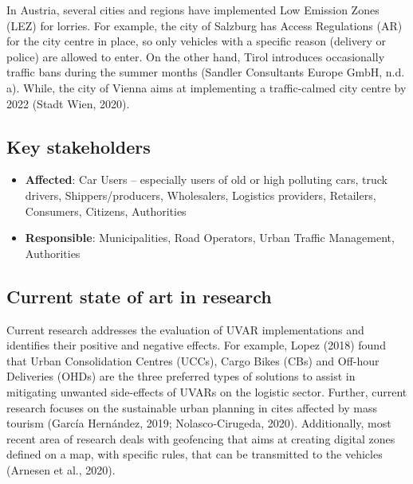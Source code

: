 \documentclass[
]{book}
\providecommand{\tightlist}{%
  \setlength{\itemsep}{0pt}\setlength{\parskip}{0pt}}
\begin{document}
In Austria, several cities and regions have implemented Low Emission Zones (LEZ) for lorries. For example, the city of Salzburg has Access Regulations (AR) for the city centre in place, so only vehicles with a specific reason (delivery or police) are allowed to enter. On the other hand, Tirol introduces occasionally traffic bans during the summer months (Sandler Consultants Europe GmbH, n.d. a). While, the city of Vienna aims at implementing a traffic-calmed city centre by 2022 (Stadt Wien, 2020).

\hypertarget{key-stakeholders-7}{%
\subsection*{Key stakeholders}\label{key-stakeholders-7}}

\begin{itemize}
\tightlist
\item
  \textbf{Affected}: Car Users -- especially users of old or high polluting cars, truck drivers, Shippers/producers, Wholesalers, Logistics providers, Retailers, Consumers, Citizens, Authorities
\item
  \textbf{Responsible}: Municipalities, Road Operators, Urban Traffic Management, Authorities
\end{itemize}

\hypertarget{current-state-of-art-in-research-7}{%
\subsection*{Current state of art in research}\label{current-state-of-art-in-research-7}}

Current research addresses the evaluation of UVAR implementations and identifies their positive and negative effects. For example, Lopez (2018) found that Urban Consolidation Centres (UCCs), Cargo Bikes (CBs) and Off-hour Deliveries (OHDs) are the three preferred types of solutions to assist in mitigating unwanted side-effects of UVARs on the logistic sector. Further, current research focuses on the sustainable urban planning in cites affected by mass tourism (García Hernández, 2019; Nolasco‐Cirugeda, 2020). Additionally, most recent area of research deals with geofencing that aims at creating digital zones defined on a map, with specific rules, that can be transmitted to the vehicles (Arnesen et al., 2020).
\end{document}
